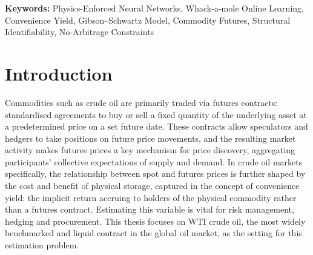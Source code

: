 \documentclass[11pt, a4paper]{article}
\newcommand{\todo}[1]{\textcolor{red}{\textbf{[TODO: #1]}}}
\begin{document}
\begin{abstract}
\todo{Write last. Single paragraph, max 300 words. Cover:
(1) Background: commodity markets require real-time estimation of the latent
    convenience yield; traditional Kalman filter approaches assume linearity.
(2) Method: propose the Affine-Partitioned, Physics-Enforced Network (AP-PEN) for the Gibson--Schwartz
    two-factor model. A single network parameterises the latent convenience-yield
    path delta\_hat\_phi(t); the affine term-structure coefficients A(tau) and B(tau)
    are imposed analytically in closed form rather than learned, so the pricing
    relation satisfies the futures PDE by construction. Physics enters through
    that hard constraint plus a P-measure OU transition likelihood and
    literature-grounded no-arbitrage inequality penalties, balanced by the
    WamOL gradient-norm scheme.
(3) Results: summarise key findings from synthetic and real-data experiments;
    comparison against Kalman filter and baseline models.
(4) Conclusions: state the main contribution and practical implications.}
\end{abstract}


\vspace{0.3cm}
\noindent\textbf{Keywords:} Physics-Enforced Neural Networks, Whack-a-mole Online Learning,
Convenience Yield, Gibson--Schwartz Model, Commodity Futures, Structural Identifiability,
No-Arbitrage Constraints



\section{Introduction}
\label{sec:introduction}

Commodities such as crude oil are primarily traded via futures contracts: standardised agreements to buy or sell a fixed quantity of the underlying asset at a predetermined price on a set future date. These contracts allow speculators and hedgers to take positions on future price movements, and the resulting market activity makes futures prices a key mechanism for price discovery, aggregating participants' collective expectations of supply and demand. In crude oil markets specifically, the relationship between spot and futures prices is further shaped by the cost and benefit of physical storage, captured in the concept of convenience yield: the implicit return accruing to holders of the physical commodity rather than a futures contract. Estimating this variable is vital for risk management, hedging and procurement. This thesis focuses on WTI crude oil, the most widely benchmarked and liquid contract in the global oil market, as the setting for this estimation problem.
\end{document}
